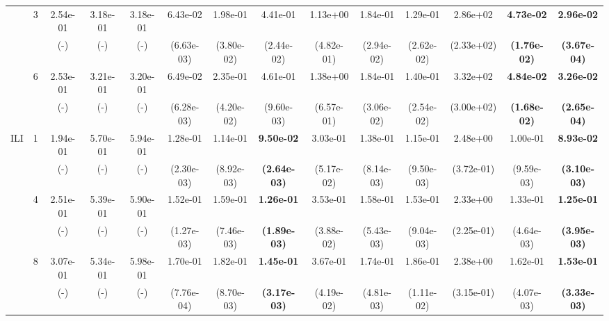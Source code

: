 \begin{table}[!t]
{\begin{tabular}{cccccccccccccc}
    \cmidrule(l){3-14}
     & \multirow{2}{*}{3}& 2.54e-01& 3.18e-01 & 3.18e-01 & 6.43e-02 & 1.98e-01& 4.41e-01& 1.13e+00 & 1.84e-01 & 1.29e-01& 2.86e+02 & \bf{4.73e-02} & \bf{2.96e-02}\s \\
     &  & (-)& (-) & (-) & (6.63e-03) & (3.80e-02)   & (2.44e-02)          & (4.82e-01) & (2.94e-02) & (2.62e-02) & (2.33e+02) & \textbf{(1.76e-02)} & \textbf{(3.67e-04)} \\
     \cmidrule(l){3-14}
     & \multirow{2}{*}{6}& 2.53e-01& 3.21e-01 & 3.20e-01 & 6.49e-02 & 2.35e-01& 4.61e-01& 1.38e+00 & 1.84e-01 & 1.40e-01& 3.32e+02 & \bf{4.84e-02} & \bf{3.26e-02}\s \\
     &  & (-)& (-) & (-) & (6.28e-03) & (4.20e-02)   & (9.60e-03)          & (6.57e-01) & (3.06e-02) & (2.54e-02) & (3.00e+02) & \textbf{(1.68e-02)} & \textbf{(2.65e-04)} \\
     \cmidrule(l){2-14}
    \multirow{6}{*}{ILI} & \multirow{2}{*}{1}& 1.94e-01& 5.70e-01 & 5.94e-01 & 1.28e-01 & 1.14e-01& \bf{9.50e-02} & 3.03e-01 & 1.38e-01 & 1.15e-01& 2.48e+00 & 1.00e-01& \bf{8.93e-02}\s \\
    &  & (-)& (-) & (-) & (2.30e-03) & (8.92e-03)   & \textbf{(2.64e-03)} & (5.17e-02) & (8.14e-03) & (9.50e-03) & (3.72e-01) & (9.59e-03)          & \textbf{(3.10e-03)} \\
    \cmidrule(l){3-14}
     & \multirow{2}{*}{4}& 2.51e-01& 5.39e-01 & 5.90e-01 & 1.52e-01 & 1.59e-01& \bf{1.26e-01} & 3.53e-01 & 1.58e-01 & 1.53e-01& 2.33e+00 & 1.33e-01& \bf{1.25e-01}\s \\
     &  & (-)& (-) & (-) & (1.27e-03) & (7.46e-03)   & \textbf{(1.89e-03)} & (3.88e-02) & (5.43e-03) & (9.04e-03) & (2.25e-01) & (4.64e-03)          & \textbf{(3.95e-03)} \\
     \cmidrule(l){3-14}
     & \multirow{2}{*}{8}& 3.07e-01& 5.34e-01 & 5.98e-01 & 1.70e-01 & 1.82e-01& \bf{1.45e-01}\s & 3.67e-01 & 1.74e-01 & 1.86e-01& 2.38e+00 & 1.62e-01& \bf{1.53e-01} \\
     &  & (-)& (-) & (-) & (7.76e-04) & (8.70e-03)   & \textbf{(3.17e-03)} & (4.19e-02) & (4.81e-03) & (1.11e-02) & (3.15e-01) & (4.07e-03)          & \textbf{(3.33e-03)} \\    
     \bottomrule
    \end{tabular}}
    \end{table}



